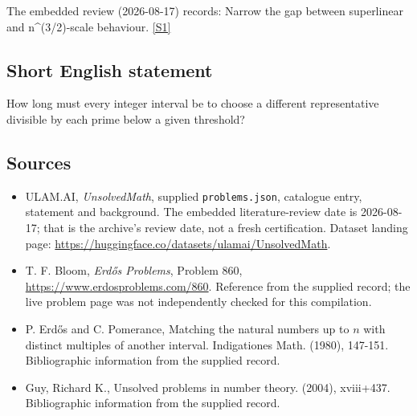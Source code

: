 \documentclass[11pt,a4paper]{article}
\newcommand{\sref}[2]{\hyperlink{source:#1:#2}{[S#2]}}
\begin{document}
The embedded review (2026-08-17) records: Narrow the gap between superlinear and n\textasciicircum{}(3/2)-scale behaviour. \sref{statement}{1}

\subsection{Short English statement}

How long must every integer interval be to choose a different representative divisible by each prime below a given threshold?

\subsection{Sources}

{\small

\begin{itemize}

\item[\hypertarget{source:statement:1}{S1}] ULAM.AI, \emph{UnsolvedMath}, supplied \texttt{problems.json}, catalogue entry, statement and background. The embedded literature-review date is 2026-08-17; that is the archive’s review date, not a fresh certification. Dataset landing page: \url{https://huggingface.co/datasets/ulamai/UnsolvedMath}.

\item[\hypertarget{source:statement:2}{S2}] T. F. Bloom, \emph{Erdős Problems}, Problem 860, \url{https://www.erdosproblems.com/860}. Reference from the supplied record; the live problem page was not independently checked for this compilation.

\item[\hypertarget{source:statement:3}{S3}] P. Erd\H{o}s and C. Pomerance, Matching the natural numbers up to $n$ with distinct multiples of another interval. Indigationes Math. (1980), 147-151. Bibliographic information from the supplied record.

\item[\hypertarget{source:statement:4}{S4}] Guy, Richard K., Unsolved problems in number theory. (2004), xviii+437. Bibliographic information from the supplied record.

\end{itemize}

}

\label{end:statement}
\end{document}
